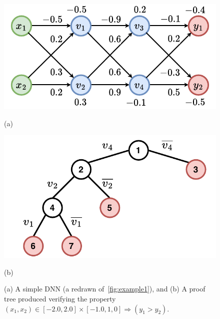 \documentclass[oneside,11pt,dvipsnames]{book}
\newcommand{\prooflang}{\texttt{BaB$_{\text{ProofLang}}$}}
\newcommand{\bab}{\texttt{BaB$_{\text{NV}}$}}
\newcommand{\neuralsat}{\texttt{NeuralSAT}}
\begin{document}




\begin{figure}[t]
    \begin{minipage}[b]{\linewidth}
        \centering
        \begin{minipage}[t]{0.48\textwidth}
            \centering  
            \includegraphics[width=\linewidth]{figure/proof_net.pdf}
            \caption*{(a)}
        \end{minipage}
        \begin{minipage}[t]{0.48\textwidth}
            \centering
            \includegraphics[width=\linewidth]{figure/proof_tree.pdf}
            \caption*{(b)}
        \end{minipage}
        \caption{(a) A simple DNN  (a redrawn of~\autoref{fig:example1}), and (b) A proof tree produced verifying the property $(x_1, x_2) \in [-2.0, 2.0] \times [-1.0, 1,0] \Rightarrow (y_1 > y_2)$.}
        \label{fig:example}
    \end{minipage}
\end{figure}
\end{document}
